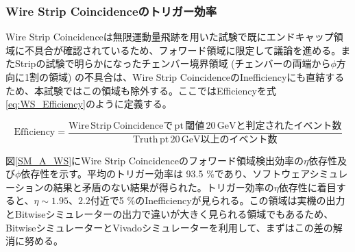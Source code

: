 \subsubsection{Wire Strip Coincidenceのトリガー効率}
Wire Strip Coincidenceは無限運動量飛跡を用いた試験で既にエンドキャップ領域に不具合が確認されているため、フォワード領域に限定して議論を進める。またStripの試験で明らかになったチェンバー境界領域 (チェンバーの両端から$\phi$方向に1割の領域) の不具合は、Wire Strip CoincidenceのInefficiencyにも直結するため、本試験ではこの領域も除外する。ここではEfficiencyを式\ref{eq:WS_Efficiency}のように定義する。

\begin{equation}
    \mathrm {Efficiency} = \frac{\mathrm{Wire\,Strip\, Coincidenceで\,pt \,閾値\,20\,GeVと判定されたイベント数}}{\mathrm{Truth\,pt \,20 \,GeV以上のイベント数}}
    \label{eq:WS_Efficiency}
\end{equation}

図\ref{SM_A_WS}にWire Strip Coincidenceのフォワード領域検出効率の$\eta$依存性及び$\phi$依存性を示す。平均のトリガー効率は 93.5 \%であり、ソフトウェアシミュレーションの結果と矛盾のない結果が得られた。トリガー効率の$\eta$依存性に着目すると、$\eta\sim1.95、2.2$付近で5 \%のInefficiencyが見られる。この領域は実機の出力とBitwiseシミュレーターの出力で違いが大きく見られる領域でもあるため、BitwiseシミュレーターとVivadoシミュレーターを利用して、まずはこの差の解消に努める。

